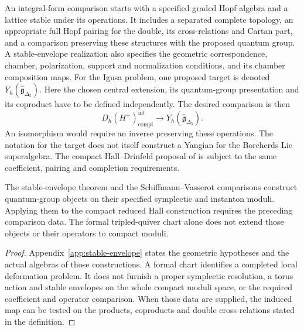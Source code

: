 \begin{definition}
\label{def:integral-form-stable-envelope-comparison-datum}
An integral-form comparison starts with a specified graded
Hopf algebra and a lattice stable under its operations. It
includes a separated complete topology, an appropriate full
Hopf pairing for the double, its cross-relations and Cartan
part, and a comparison preserving these structures with the
proposed quantum group. A stable-envelope realization also
specifies the geometric correspondence, chamber,
polarization, support and normalization conditions, and its
chamber composition maps.
For the Igusa problem, one proposed target is denoted
$Y_\hbar(\widehat{\mathfrak g}_{\Delta_5})$. Here the chosen
central extension, its quantum-group presentation and its
coproduct have to be defined independently. The desired
comparison is then
\[
 D_\hbar(H^+)^{\mathrm{int}}_{\mathrm{compl}}
 \longrightarrow Y_\hbar(\widehat{\mathfrak g}_{\Delta_5}).
\]
An isomorphism would require an inverse preserving these
operations. The notation for the target does not itself
construct a Yangian for the Borcherds Lie superalgebra.
The compact Hall--Drinfeld proposal of \cite{CYQGVolIII} is
subject to the same coefficient, pairing and completion requirements.
\end{definition}

\begin{proposition}
\label{prop:integral-form-stable-envelope-transport-firewall}
The stable-envelope theorem and the Schiffmann--Vasserot
comparisons construct quantum-group objects on their specified
symplectic and instanton moduli. Applying them to the compact
reduced Hall construction requires the preceding comparison
data. The formal tripled-quiver chart alone does not extend
those objects or their operators to compact moduli.
\end{proposition}

\begin{proof}
Appendix~\ref{app:stable-envelope} states the geometric
hypotheses and the actual algebras of those constructions.
A formal chart identifies a completed local deformation
problem. It does not furnish a proper symplectic resolution,
a torus action and stable envelopes on the whole compact
moduli space, or the required coefficient and operator
comparison. When those data are supplied, the induced map
can be tested on the products, coproducts and double
cross-relations stated in the definition.
\end{proof}

